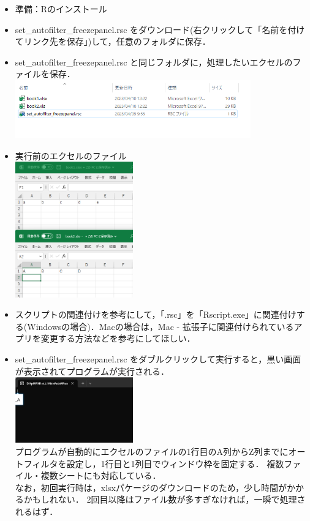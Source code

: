 \documentclass[
]{article}
\providecommand{\tightlist}{%
  \setlength{\itemsep}{0pt}\setlength{\parskip}{0pt}}
\begin{document}
\begin{itemize}
\tightlist
\item
  準備：Rのインストール\\
\item
  set\_autofilter\_freezepanel.rsc
  をダウンロード(右クリックして「名前を付けてリンク先を保存」)して，任意のフォルダに保存．\\
\item
  set\_autofilter\_freezepanel.rsc と同じフォルダに，処理したいエクセルのファイルを保存．\\
  \includegraphics[width=0.8\textwidth,height=\textheight]{img/set_autofilter_freezepanel01.png}\\
\item
  実行前のエクセルのファイル\\
  \includegraphics[width=0.4\textwidth,height=\textheight]{img/set_autofilter_freezepanel02.png}\\
\item
  スクリプトの関連付けを参考にして，「.rsc」を「Rscript.exe」に関連付けする(Windowsの場合)．Macの場合は，Mac - 拡張子に関連付けられているアプリを変更する方法などを参考にしてほしい．\\
\item
  set\_autofilter\_freezepanel.rsc をダブルクリックして実行すると，黒い画面が表示されてプログラムが実行される．\\
  \includegraphics[width=0.4\textwidth,height=\textheight]{img/set_autofilter_freezepanel03.png}\\
  プログラムが自動的にエクセルのファイルの1行目のA列からZ列までにオートフィルタを設定し，1行目と1列目でウィンドウ枠を固定する．
  複数ファイル・複数シートにも対応している．\\
  なお，初回実行時は，xlsxパケージのダウンロードのため，少し時間がかかるかもしれない．
  2回目以降はファイル数が多すぎなければ，一瞬で処理されるはず．
\end{itemize}
\end{document}
